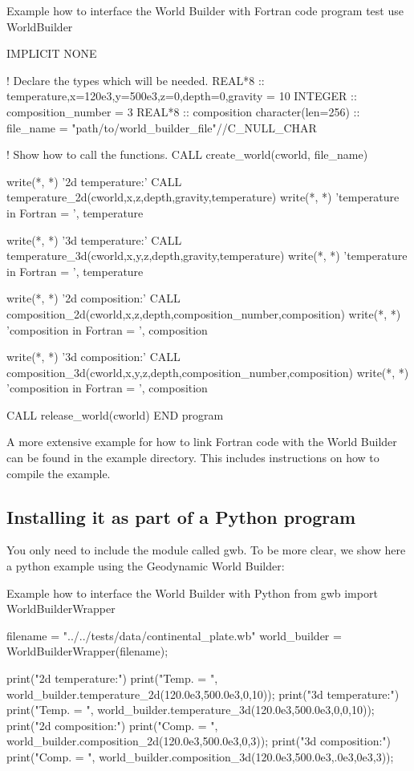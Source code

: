 \documentclass{book}
\newcommand{\GWB}{{Geodynamic World Builder}}
\newcommand{\WB}{{World Builder}}
\begin{document}
\begin{fortrancode}{Example how to interface the \WB{} with Fortran code}
program test
use WorldBuilder

IMPLICIT NONE

  ! Declare the types which will be needed.
  REAL*8 :: temperature,x=120e3,y=500e3,z=0,depth=0,gravity = 10
  INTEGER :: composition_number = 3
  REAL*8 :: composition
  character(len=256) :: file_name = "path/to/world_builder_file"//C_NULL_CHAR

  ! Show how to call the functions.
  CALL create_world(cworld, file_name)

  write(*, *) '2d temperature:'
  CALL temperature_2d(cworld,x,z,depth,gravity,temperature)
  write(*, *) 'temperature in Fortran = ', temperature

  write(*, *) '3d temperature:'
  CALL temperature_3d(cworld,x,y,z,depth,gravity,temperature)
  write(*, *) 'temperature in Fortran = ', temperature

    write(*, *) '2d composition:'
  CALL composition_2d(cworld,x,z,depth,composition_number,composition)
  write(*, *) 'composition in Fortran = ', composition

  write(*, *) '3d composition:'
  CALL composition_3d(cworld,x,y,z,depth,composition_number,composition)
  write(*, *) 'composition in Fortran = ', composition

  CALL release_world(cworld)
END program
\end{fortrancode}

A more extensive example for how to link Fortran code with the \WB{} can be found in the example directory. This includes instructions on how to compile the example.

\subsection{Installing it as part of a Python program}
You only need to include the module called gwb. To be more clear, we show here a python example using the \GWB{}:

\begin{pythoncode}{Example how to interface the \WB{} with Python}
from gwb import WorldBuilderWrapper

filename = "../../tests/data/continental_plate.wb"
world_builder = WorldBuilderWrapper(filename);

print("2d temperature:")
print("Temp. = ", world_builder.temperature_2d(120.0e3,500.0e3,0,10));
print("3d temperature:")
print("Temp.  = ", world_builder.temperature_3d(120.0e3,500.0e3,0,0,10));
print("2d composition:")
print("Comp. = ", world_builder.composition_2d(120.0e3,500.0e3,0,3));
print("3d composition:")
print("Comp. = ", world_builder.composition_3d(120.0e3,500.0e3,.0e3,0e3,3));
\end{pythoncode}
\end{document}
